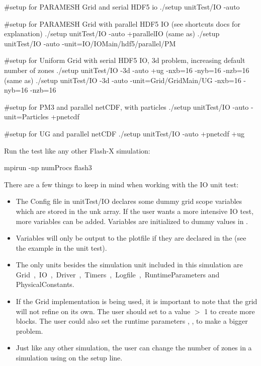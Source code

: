 \begin{codeseg}
#setup for PARAMESH Grid and serial HDF5 io
./setup unitTest/IO -auto

#setup for PARAMESH Grid with parallel HDF5 IO (see shortcuts docs for explanation)
./setup unitTest/IO -auto +parallelIO     (same as)
./setup unitTest/IO -auto -unit=IO/IOMain/hdf5/parallel/PM

#setup for Uniform Grid with serial HDF5 IO, 3d problem, increasing default number of zones
./setup unitTest/IO -3d -auto +ug -nxb=16 -nyb=16 -nzb=16  (same as)
./setup unitTest/IO -3d -auto -unit=Grid/GridMain/UG -nxb=16 -nyb=16 -nzb=16


#setup for PM3 and parallel netCDF, with particles
./setup unitTest/IO -auto -unit=Particles +pnetcdf


#setup for UG and parallel netCDF
./setup unitTest/IO -auto +pnetcdf +ug
\end{codeseg}

Run the test like any other Flash-X simulation:
\begin{codeseg}
mpirun -np numProcs flash3
\end{codeseg}

There are a few things to keep in mind when working with the IO unit test:
\begin{itemize}
\item The Config file in unitTest/IO declares some dummy grid scope
variables which are stored in the unk array.  If the user wants a more
intensive IO test, more variables can be added.  Variables are
initialized to dummy values in . 

\item Variables will only be output to the plotfile if they are declared in
the  (see the example  in the unit test).

\item The only units besides the simulation unit included in this
simulation are \unit{Grid, IO, Driver, Timers, Logfile, RuntimeParameters}
and \unit{PhysicalConstants}. 

\item If the \Paramesh Grid implementation is being used, it is important to
note that the grid will not refine on its own.  The user should set
 to a value $>$ 1 to create more blocks.  The user could also
set the runtime parameters , ,  to make a bigger
problem. 

\item Just like any other simulation, the user can change the number of
zones in a simulation using  on the setup line.
\end{itemize}




